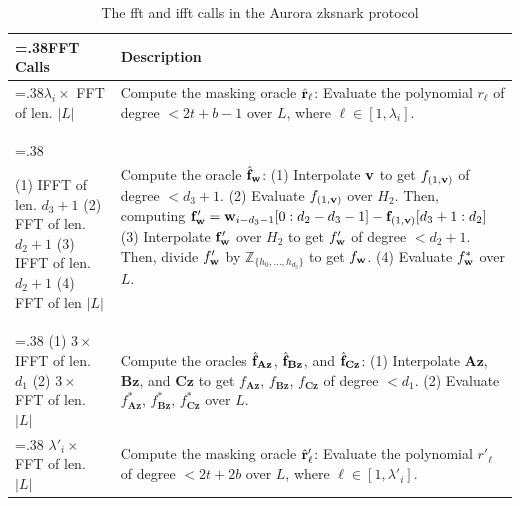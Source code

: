 \begin{table}
	\centering
	\caption[The FFT and IFFT calls in the Aurora zkSNARK protocol]{The \gls{fft} and \gls{ifft} calls in the Aurora \gls{zksnark} protocol}
	{
		\label{tab:fftcalls}
		\begin{tabularx}{\linewidth}{>{\hsize=.38\hsize}XX}
			\toprule
			\textbf{FFT Calls} & \textbf{Description} \\
			\midrule
			$\lambda_i \times$ FFT of len. $|L|$ & Compute the masking oracle $\hat{{\bf{r}}}_\ell$: Evaluate the polynomial $r_\ell$ of degree $<2t+b-1$ over $L$, where $\ell \in [1,\lambda_i]$. \\
			\midrule
			
			(1) IFFT of len. $d_3 + 1$\newline
			(2) FFT of len. $d_2 + 1$\newline
			(3) IFFT of len. $d_2 + 1$\newline
			(4) FFT of len $|L|$
			& Compute the oracle $\hat{{\bf{f}}}_{\bf{w}}$: \newline
			(1) Interpolate ${\bf{v}}$ to get $f_{(1,{\bf{v}})}$ of degree $<d_3 + 1$. \newline
			(2) Evaluate $f_{(1,{\bf{v}})}$ over $H_2$. \newline 
			Then, computing \newline ${\bf{f}}'_{\bf{w}} = {{\bf{w}}_{i-d_3-1}[0:d_2- d_3 - 1] - {\bf{f}}_{(1,{\bf{v}})}[d_3+1:d_2]}$ \newline
			(3) Interpolate ${\bf{f}}'_{\bf{w}}$ over $H_2$ to get $f'_{\bf{w}}$ of degree $< d_2 + 1$. \newline
			Then, divide $f'_{\bf{w}}$ by $\mathbb{Z}_{\{h_0,\dots, h_{d_3}\}}$ to get $f_{\bf{w}}$.\newline
			(4) Evaluate $f_{\bf{w}}^*$ over $L$.
			\\
			\midrule
			(1) $3 \times$ IFFT of len. $d_1$\newline
			(2) $3 \times$ FFT of len. $|L|$
			&
			Compute the oracles $\hat{{\bf{f}}}_{\mathbf{Az}}$, $\hat{{\bf{f}}}_{\mathbf{Bz}}$, and $\hat{{\bf{f}}}_{\mathbf{Cz}}$:\newline
			(1) Interpolate $\mathbf{Az}$, $\mathbf{Bz}$, and $\mathbf{Cz}$ to get $f_\mathbf{Az}$, $f_\mathbf{Bz}$, $f_\mathbf{Cz}$ of degree $<d_1$.\newline
			(2) Evaluate $f_\mathbf{Az}^*$, $f_\mathbf{Bz}^*$, $f_\mathbf{Cz}^*$ over $L$.
			\\
			\midrule
			$\lambda'_i \times$ FFT of len. $|L|$ & Compute the masking oracle $\hat{{\bf{r}}}'_\ell$: Evaluate the polynomial $r'_\ell$ of degree $<2t+2b$ over $L$, where $\ell \in [1,\lambda'_i]$. \\

\end{tabularx}}
\end{table}
